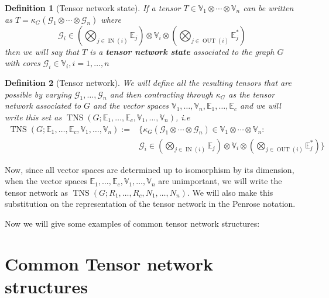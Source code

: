 \documentclass[11pt,a4paper,openright,oneside]{book}
\numberwithin{equation}{section}
\newtheorem{defn0}{Definition}[chapter]
\newenvironment{definition}{ \begin{defn0}}{\end{defn0}}
\DeclareMathOperator{\IN}{IN}
\DeclareMathOperator{\OUT}{OUT}
\DeclareMathOperator{\TNS}{TNS}
\begin{document}
\begin{definition}[Tensor network state]
    If a tensor $T \in \mathbb{V}_1 \otimes \cdots \otimes \mathbb{V}_n$ can be written as $T = \kappa_G(\mathcal{G}_1 \otimes \cdots \otimes \mathcal{G}_n)$ where
    $$\mathcal{G}_i \in \left( \bigotimes\nolimits_{j \in \IN (i)} \mathbb{E}_j \right) \otimes \mathbb{V}_i \otimes 
\left( \bigotimes\nolimits_{j \in \OUT (i)} \mathbb{E}_j^*  \right)$$
then we will say that $T$ is a \textbf{tensor network state} associated to the graph $G$ with cores $\mathcal{G}_i \in \mathbb{V}_i, i = 1, \dots, n$
\end{definition}

\begin{definition}[Tensor network]
    We will define all the resulting tensors that are possible by varying $\mathcal{G}_1, \dots, \mathcal{G}_n$ and then contracting through $\kappa_G$ as the tensor network
associated to $G$ and the vector spaces $\mathbb{V}_1, \dots, \mathbb{V}_n, \mathbb{E}_1, \dots, \mathbb{E}_c$ and we will write this set
as $\TNS(G; \mathbb{E}_1, \dots, \mathbb{E}_c, \mathbb{V}_1, \dots, \mathbb{V}_n)$, i.e
$$
\begin{align}
    \TNS(G; \mathbb{E}_1, \dots, \mathbb{E}_c, \mathbb{V}_1, \dots, \mathbb{V}_n) := & \Bigg\{ \kappa_G(\mathcal{G}_1 \otimes \cdots \otimes \mathcal{G}_n) \in \mathbb{V}_1 \otimes \cdots \otimes \mathbb{V}_n : \\
                                                                                     & \mathcal{G}_i \in \left( \bigotimes\nolimits_{j \in \IN (i)} \mathbb{E}_j \right) \otimes \mathbb{V}_i \otimes 
\left( \bigotimes\nolimits_{j \in \OUT (i)} \mathbb{E}_j^*  \right) \Bigg\}
\end{align}
$$
\end{definition}
Now, since all vector spaces are determined up to isomorphism by its dimension, when the vector spaces $\mathbb{E}_1, \dots, \mathbb{E}_c, \mathbb{V}_1, \dots, \mathbb{V}_n$ are unimportant,
we will write the tensor network as $\TNS(G; R_1, \dots, R_c, N_1, \dots, N_n)$. We will also make this substitution on the representation of the
tensor network in the Penrose notation.

Now we will give some examples of common tensor network structures:


\section{Common Tensor network structures}
\end{document}
